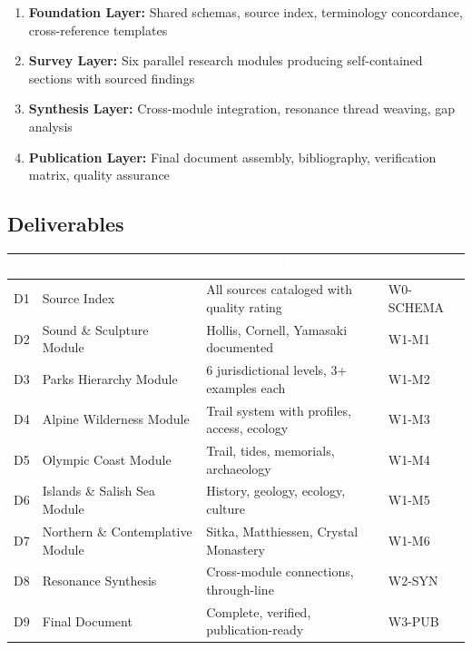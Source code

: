 \documentclass[11pt,letterpaper]{article}
\newcommand{\tableheader}[1]{\textbf{\sffamily\textcolor{white}{#1}}}
\begin{document}
\begin{enumerate}[leftmargin=2em]
\item \textbf{Foundation Layer:} Shared schemas, source index, terminology concordance, cross-reference templates
\item \textbf{Survey Layer:} Six parallel research modules producing self-contained sections with sourced findings
\item \textbf{Synthesis Layer:} Cross-module integration, resonance thread weaving, gap analysis
\item \textbf{Publication Layer:} Final document assembly, bibliography, verification matrix, quality assurance
\end{enumerate}

\subsection{Deliverables}

\begin{center}
\begin{tabularx}{\textwidth}{C{0.8cm}L{3.5cm}XC{2cm}}
\toprule
{}
\tableheader{\#} & \tableheader{Deliverable} & \tableheader{Acceptance Criteria} & \tableheader{Spec} \\
\midrule
D1 & Source Index & All sources cataloged with quality rating & W0-SCHEMA \\
D2 & Sound \& Sculpture Module & Hollis, Cornell, Yamasaki documented & W1-M1 \\
D3 & Parks Hierarchy Module & 6 jurisdictional levels, 3+ examples each & W1-M2 \\
D4 & Alpine Wilderness Module & Trail system with profiles, access, ecology & W1-M3 \\
D5 & Olympic Coast Module & Trail, tides, memorials, archaeology & W1-M4 \\
D6 & Islands \& Salish Sea Module & History, geology, ecology, culture & W1-M5 \\
D7 & Northern \& Contemplative Module & Sitka, Matthiessen, Crystal Monastery & W1-M6 \\
D8 & Resonance Synthesis & Cross-module connections, through-line & W2-SYN \\
D9 & Final Document & Complete, verified, publication-ready & W3-PUB \\
\bottomrule
\end{tabularx}
\end{center}
\end{document}
